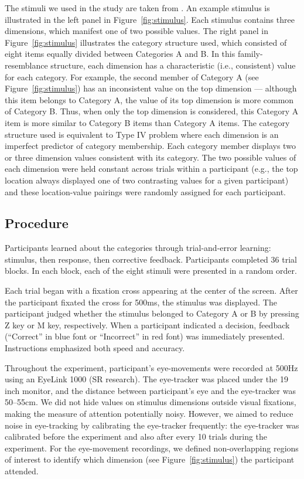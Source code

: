 \documentclass[man,floatsintext]{apa6}
\begin{document}
The stimuli we used in the study are taken from \textcite{Blair2009}. An example stimulus is
illustrated in the left panel in Figure~\ref{fig:stimulus}. Each stimulus contains three dimensions,
which manifest one of two possible values. The right panel in Figure~\ref{fig:stimulus} illustrates
the category structure used, which consisted of eight items equally divided between Categories A and
B. In this family-resemblance structure, each dimension has a characteristic (i.e., consistent)
value for each category.  For example, the second member of Category A (see
Figure~\ref{fig:stimulus}) has an inconsistent value on the top dimension --- although this item
belongs to Category A, the value of its top dimension is more common of Category B.  Thus, when only
the top dimension is considered, this Category A item is more similar to Category B items than
Category A items. The category structure used is equivalent to Type IV problem
\parencite{Shepard1961a} where each dimension is an imperfect predictor of category membership. Each
category member displays two or three dimension values consistent with its category. The two
possible values of each dimension were held constant across trials within a participant (e.g., the
top location always displayed one of two contrasting values for a given participant) and these
location-value pairings were randomly assigned for each participant.

\subsection{Procedure}

Participants learned about the categories through trial-and-error learning: stimulus, then response,
then corrective feedback. Participants completed 36 trial blocks. In each block, each of the eight
stimuli were presented in a random order.

Each trial began with a fixation cross appearing at the center of the screen. After the participant
fixated the cross for 500ms, the stimulus was displayed. The participant judged whether the stimulus
belonged to Category A or B by pressing Z key or M key, respectively. When a participant indicated a
decision, feedback (``Correct'' in blue font or ``Incorrect'' in red font) was immediately
presented. Instructions emphasized both speed and accuracy.

Throughout the experiment, participant's eye-movements were recorded at 500Hz using an EyeLink 1000
(SR research).  The eye-tracker was placed under the 19 inch monitor, and the distance between
participant's eye and the eye-tracker was 50--55cm.  We did not hide values on stimulus dimensions
outside visual fixations, making the measure of attention potentially noisy.  However, we aimed to
reduce noise in eye-tracking by calibrating the eye-tracker frequently: the eye-tracker was
calibrated before the experiment and also after every 10 trials during the experiment.  For the
eye-movement recordings, we defined non-overlapping regions of interest to identify which dimension
(see Figure~\ref{fig:stimulus}) the participant attended.
\end{document}
